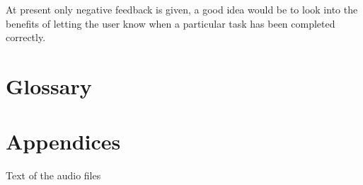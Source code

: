 \documentclass{article}
\begin{document}
\newpage


\newpage


\newpage


\newpage


At present only negative feedback is given, a good idea would be to look into the benefits of letting the user know when a particular task has been completed correctly.

\newpage


\newpage
\section{Glossary}

\newpage
\section{Appendices}
Text of the audio files
\newpage
{}

\end{document}
